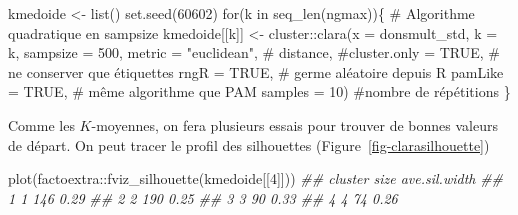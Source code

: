 \documentclass[
  11pt,
  letterpaper,
]{book}
\newenvironment{Shaded}{\begin{snugshade}}{\end{snugshade}}
\newcommand{\AttributeTok}[1]{\textcolor[rgb]{0.40,0.45,0.13}{#1}}
\newcommand{\CommentTok}[1]{\textcolor[rgb]{0.37,0.37,0.37}{#1}}
\newcommand{\ConstantTok}[1]{\textcolor[rgb]{0.56,0.35,0.01}{#1}}
\newcommand{\ControlFlowTok}[1]{\textcolor[rgb]{0.00,0.23,0.31}{#1}}
\newcommand{\DecValTok}[1]{\textcolor[rgb]{0.68,0.00,0.00}{#1}}
\newcommand{\DocumentationTok}[1]{\textcolor[rgb]{0.37,0.37,0.37}{\textit{#1}}}
\newcommand{\FunctionTok}[1]{\textcolor[rgb]{0.28,0.35,0.67}{#1}}
\newcommand{\NormalTok}[1]{\textcolor[rgb]{0.00,0.23,0.31}{#1}}
\newcommand{\OtherTok}[1]{\textcolor[rgb]{0.00,0.23,0.31}{#1}}
\newcommand{\SpecialCharTok}[1]{\textcolor[rgb]{0.37,0.37,0.37}{#1}}
\newcommand{\StringTok}[1]{\textcolor[rgb]{0.13,0.47,0.30}{#1}}
\theoremstyle{definition}
\theoremstyle{remark}
\begin{document}
\begin{Shaded}
\begin{Highlighting}[]
\NormalTok{kmedoide }\OtherTok{\textless{}{-}} \FunctionTok{list}\NormalTok{()}
\FunctionTok{set.seed}\NormalTok{(}\DecValTok{60602}\NormalTok{)}
\ControlFlowTok{for}\NormalTok{(k }\ControlFlowTok{in} \FunctionTok{seq\_len}\NormalTok{(ngmax))\{}
  \CommentTok{\# Algorithme quadratique en sampsize}
\NormalTok{kmedoide[[k]] }\OtherTok{\textless{}{-}}\NormalTok{ cluster}\SpecialCharTok{::}\FunctionTok{clara}\NormalTok{(}\AttributeTok{x =}\NormalTok{ donsmult\_std,}
               \AttributeTok{k =}\NormalTok{ k,}
               \AttributeTok{sampsize =} \DecValTok{500}\NormalTok{,}
               \AttributeTok{metric =} \StringTok{"euclidean"}\NormalTok{, }\CommentTok{\# distance,}
               \CommentTok{\#cluster.only = TRUE, \# ne conserver que étiquettes}
               \AttributeTok{rngR =} \ConstantTok{TRUE}\NormalTok{, }\CommentTok{\# germe aléatoire depuis R}
               \AttributeTok{pamLike =} \ConstantTok{TRUE}\NormalTok{, }\CommentTok{\# même algorithme que PAM}
               \AttributeTok{samples =} \DecValTok{10}\NormalTok{) }\CommentTok{\#nombre de répétitions}
\NormalTok{\}}
\end{Highlighting}
\end{Shaded}

Comme les \(K\)-moyennes, on fera plusieurs essais pour trouver de
bonnes valeurs de départ. On peut tracer le profil des silhouettes
(Figure~\ref{fig-clarasilhouette})

\begin{Shaded}
\begin{Highlighting}[]
\FunctionTok{plot}\NormalTok{(factoextra}\SpecialCharTok{::}\FunctionTok{fviz\_silhouette}\NormalTok{(kmedoide[[}\DecValTok{4}\NormalTok{]]))}
\DocumentationTok{\#\#   cluster size ave.sil.width}
\DocumentationTok{\#\# 1       1  146          0.29}
\DocumentationTok{\#\# 2       2  190          0.25}
\DocumentationTok{\#\# 3       3   90          0.33}
\DocumentationTok{\#\# 4       4   74          0.26}
\end{Highlighting}
\end{Shaded}
\end{document}
